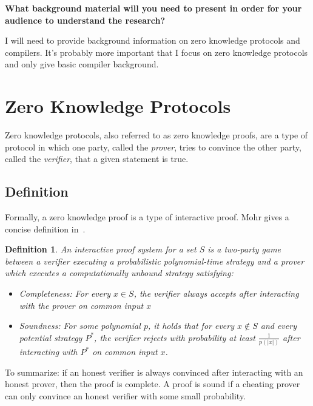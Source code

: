\documentclass{sig-alternate}
\newtheorem{interactiveProof}{Definition}
\begin{document}
	\textbf{What background material will you need to present in order for your audience to understand the research?}
	
	I will need to provide background information on zero knowledge protocols and
	compilers. It's probably more important that I focus on zero knowledge protocols and
	only give basic compiler background.
	


\section{Zero Knowledge Protocols}
	Zero	 knowledge protocols, also referred to as zero knowledge proofs, are a type
	of protocol in which one party, called the \textit{prover}, tries to convince the 
	other party, called the \textit{verifier}, that a given statement is true.
	
	\subsection{Definition}
		Formally, a zero knowledge proof is a type of interactive proof. Mohr gives
		a concise definition in~\cite{Survey}.
	
		\begin{interactiveProof}
			An interactive proof system for a set $S$ is a two-party game between a
			\textit{verifier} executing a probabilistic polynomial-time strategy and
			a \textit{prover} which executes a computationally unbound strategy 
			satisfying:
			
			\begin{itemize}
				\item \textit{Completeness}: For every $ x \in S$, the verifier always
				accepts after interacting with the prover on common input $x$
				
				\item \textit{Soundness}: For some polynomial $p$, it holds that for
				every $x \notin S$ and every potential strategy $P^{*}$, the verifier
				rejects with probability at least $\frac{1}{p(|x|)}$ after interacting
				with $P^{*}$ on common input $x$.
			\end{itemize}
			
		\end{interactiveProof}
		
		To summarize: if an honest verifier is always convinced after interacting with
		an honest prover, then the proof is complete. A proof is sound if a cheating
		prover can only convince an honest verifier with some small probability.
		
\end{document}
